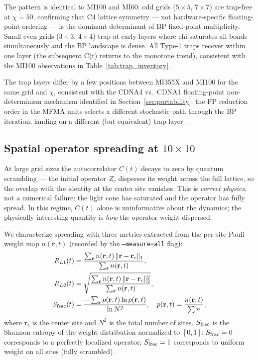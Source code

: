 \documentclass[11pt]{article}
\begin{document}
The pattern is identical to MI100 and MI60: odd grids ($5\times5$, $7\times7$)
are trap-free at $\chi=50$, confirming that C4 lattice symmetry --- not
hardware-specific floating-point ordering --- is the dominant determinant of BP
fixed-point multiplicity.
Small even grids ($3\times3$, $4\times4$) trap at early layers where chi
saturates all bonds simultaneously and the BP landscape is dense.
All Type-1 traps recover within one layer (the subsequent C(t) returns to the
monotone trend), consistent with the MI100 observations in
Table~\ref{tab:trap_inventory}.

The trap layers differ by a few positions between MI355X and MI100 for the same
grid and $\chi$, consistent with the CDNA4 vs.\ CDNA1 floating-point non-determinism
mechanism identified in Section~\ref{sec:portability}: the FP reduction order in
the MFMA units selects a different stochastic path through the BP iteration,
landing on a different (but equivalent) trap layer.

\subsection*{Spatial operator spreading at $10\times10$}

At large grid sizes the autocorrelator $C(t)$ decays to zero by quantum scrambling
--- the initial operator $Z_c$ disperses its weight across the full lattice, so the
overlap with the identity at the center site vanishes.
This is \emph{correct physics}, not a numerical failure: the light cone has
saturated and the operator has fully spread.
In this regime, $C(t)$ alone is uninformative about the dynamics; the physically
interesting quantity is \emph{how} the operator weight dispersed.

We characterize spreading with three metrics extracted from the per-site Pauli
weight map $n(\mathbf{r}, t)$ (recorded by the \texttt{--measure=all} flag):
\begin{align}
  R_{L1}(t)  &= \frac{\sum_{\mathbf{r}} n(\mathbf{r},t)\,
                      \|\mathbf{r}-\mathbf{r}_c\|_1}{\sum_{\mathbf{r}} n(\mathbf{r},t)},
              \label{eq:rl1} \\
  R_{L2}(t)  &= \sqrt{\frac{\sum_{\mathbf{r}} n(\mathbf{r},t)\,
                      \|\mathbf{r}-\mathbf{r}_c\|_2^2}{\sum_{\mathbf{r}} n(\mathbf{r},t)}},
              \label{eq:rl2} \\
  S_{\rm frac}(t) &= \frac{-\sum_{\mathbf{r}} p(\mathbf{r},t)\ln p(\mathbf{r},t)}
                          {\ln N^2},
              \quad p(\mathbf{r},t) = \frac{n(\mathbf{r},t)}{\sum n},
              \label{eq:sfrac}
\end{align}
where $\mathbf{r}_c$ is the center site and $N^2$ is the total number of sites.
$S_{\rm frac}$ is the Shannon entropy of the weight distribution normalized to
$[0,1]$: $S_{\rm frac}=0$ corresponds to a perfectly localized operator;
$S_{\rm frac}=1$ corresponds to uniform weight on all sites (fully scrambled).
\end{document}
